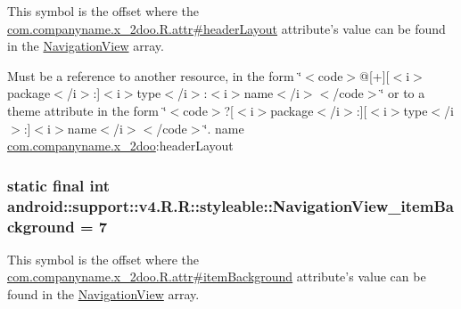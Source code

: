 This symbol is the offset where the \hyperlink{classcom_1_1companyname_1_1x__2doo_1_1_r_1_1attr_8089b41de18447ef8cbebe46d1fc644b}{com.companyname.x\_\-2doo.R.attr\#headerLayout} attribute's value can be found in the \hyperlink{classandroid_1_1support_1_1v4_1_1_r_1_1styleable_5278cd545a73a5a4af313995900ae2d8}{NavigationView} array.

Must be a reference to another resource, in the form \char`\"{}$<$code$>$@\mbox{[}+\mbox{]}\mbox{[}$<$i$>$package$<$/i$>$:\mbox{]}$<$i$>$type$<$/i$>$:$<$i$>$name$<$/i$>$$<$/code$>$\char`\"{} or to a theme attribute in the form \char`\"{}$<$code$>$?\mbox{[}$<$i$>$package$<$/i$>$:\mbox{]}\mbox{[}$<$i$>$type$<$/i$>$:\mbox{]}$<$i$>$name$<$/i$>$$<$/code$>$\char`\"{}.  name \hyperlink{namespacecom_1_1companyname_1_1x__2doo}{com.companyname.x\_\-2doo}:headerLayout \hypertarget{classandroid_1_1support_1_1v4_1_1_r_1_1styleable_eab074addccc9ceec10abf5ca55513c9}{
\subsubsection[{NavigationView\_\-itemBackground}]{\setlength{\rightskip}{0pt plus 5cm}static final int android::support::v4.R.R::styleable::NavigationView\_\-itemBackground = 7}}
\label{classandroid_1_1support_1_1v4_1_1_r_1_1styleable_eab074addccc9ceec10abf5ca55513c9}


This symbol is the offset where the \hyperlink{classcom_1_1companyname_1_1x__2doo_1_1_r_1_1attr_c3fdfd3a1290e179f9d4db208e3c6bc7}{com.companyname.x\_\-2doo.R.attr\#itemBackground} attribute's value can be found in the \hyperlink{classandroid_1_1support_1_1v4_1_1_r_1_1styleable_5278cd545a73a5a4af313995900ae2d8}{NavigationView} array.

